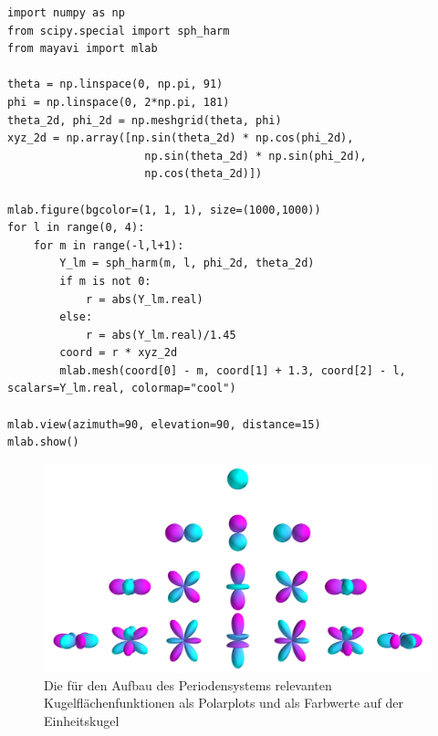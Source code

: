 \documentclass[9pt]{report}
\begin{document}
\begin{tcolorbox}[colback=violet!3!white,colframe=violet!90!white,title={\textbf{Visualisierung der Kugelflächenfunktionen mit Mayavi}}]
\begin{small}
\begin{lstlisting}
import numpy as np
from scipy.special import sph_harm
from mayavi import mlab
	
theta = np.linspace(0, np.pi, 91)
phi = np.linspace(0, 2*np.pi, 181)
theta_2d, phi_2d = np.meshgrid(theta, phi)
xyz_2d = np.array([np.sin(theta_2d) * np.cos(phi_2d),
                     np.sin(theta_2d) * np.sin(phi_2d),
                     np.cos(theta_2d)])

mlab.figure(bgcolor=(1, 1, 1), size=(1000,1000))
for l in range(0, 4):
    for m in range(-l,l+1):
        Y_lm = sph_harm(m, l, phi_2d, theta_2d)
        if m is not 0:
            r = abs(Y_lm.real)
        else:
            r = abs(Y_lm.real)/1.45
        coord = r * xyz_2d
        mlab.mesh(coord[0] - m, coord[1] + 1.3, coord[2] - l, scalars=Y_lm.real, colormap="cool")
		
mlab.view(azimuth=90, elevation=90, distance=15)
mlab.show()
\end{lstlisting}
\end{small}
\end{tcolorbox}



\begin{figure}[h]
	\centering
	\includegraphics[width=16.3cm]{5-Kugelflaechenfunktionen.jpg}
	\caption{Die für den Aufbau des Periodensystems relevanten Kugelflächenfunktionen als Polarplots und als Farbwerte auf der Einheitskugel}
\end{figure}
\end{document}
